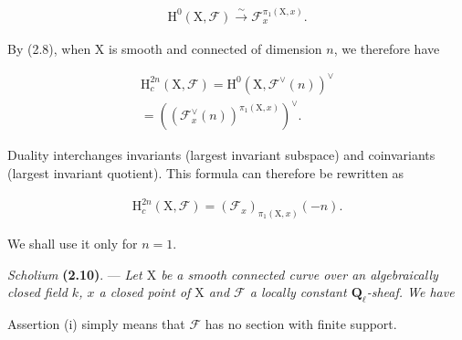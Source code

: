 \documentclass[10pt,leqno]{article}
\begin{document}
\begin{equation*}\begin{gathered}\mathrm{H}^{0}(\mathrm{X},\mathcal{F} ) \xrightarrow{\sim } \mathcal{F} _{x}^{\pi _{1}(\mathrm{X},x)}.\end{gathered}\tag{2.9.1}\end{equation*}

\noindent By (2.8), when \(\mathrm{X}\) is smooth and connected of dimension \(n\), we therefore have\par

\begin{equation*}\begin{gathered}\mathrm{H}_{c}^{2n}(\mathrm{X},\mathcal{F} ) = \mathrm{H}^{0}(\mathrm{X},\mathcal{F} ^{\vee }(n))^{\vee } \\ = ((\mathcal{F} _{x}^{\vee }(n))^{\pi _{1}(\mathrm{X},x)})^{\vee }.\end{gathered}\end{equation*}

\noindent Duality interchanges invariants (largest invariant subspace) and coinvariants (largest invariant quotient). This formula can therefore be rewritten as\par

\begin{equation*}\begin{gathered}\mathrm{H}_{c}^{2n}(\mathrm{X},\mathcal{F} ) = (\mathcal{F} _{x})_{\pi _{1}(\mathrm{X},x)}(- n).\end{gathered}\end{equation*}

\noindent We shall use it only for \(n=1\).\par

\noindent \emph{Scholium} \textbf{(2.10)}. — {\itshape Let \(\mathrm{X}\) be a smooth connected curve over an algebraically closed field \(k\), \(x\) a closed point of \(\mathrm{X}\) and \(\mathcal{F} \) a locally constant \(\mathbf{Q}_{\ell }\)-sheaf. We have}\par

\par

\noindent Assertion (i) simply means that \(\mathcal{F} \) has no section with finite support.\par
\end{document}
